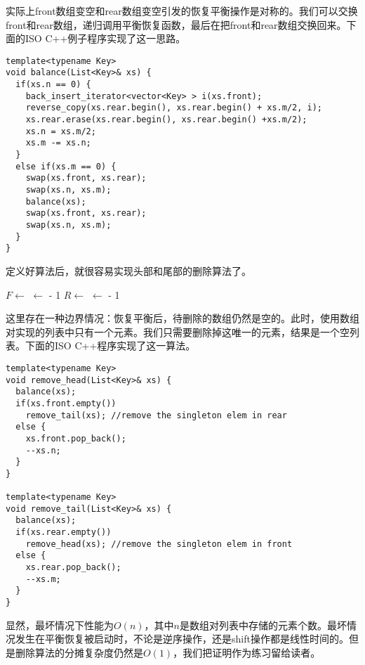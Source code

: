 \documentclass[UTF8]{article}
\begin{document}
实际上front数组变空和rear数组变空引发的恢复平衡操作是对称的。我们可以交换front和rear数组，递归调用平衡恢复函数，最后在把front和rear数组交换回来。下面的ISO C++例子程序实现了这一思路。

\begin{lstlisting}
template<typename Key>
void balance(List<Key>& xs) {
  if(xs.n == 0) {
    back_insert_iterator<vector<Key> > i(xs.front);
    reverse_copy(xs.rear.begin(), xs.rear.begin() + xs.m/2, i);
    xs.rear.erase(xs.rear.begin(), xs.rear.begin() +xs.m/2);
    xs.n = xs.m/2;
    xs.m -= xs.n;
  }
  else if(xs.m == 0) {
    swap(xs.front, xs.rear);
    swap(xs.n, xs.m);
    balance(xs);
    swap(xs.front, xs.rear);
    swap(xs.n, xs.m);
  }
}
\end{lstlisting}

定义好算法后，就很容易实现头部和尾部的删除算法了。

\begin{algorithmic}
  \State {}
  \State $F \gets $ 
    \State {}
  \Else
    \State {} $\gets $  - 1
  \EndIf
\EndFunction
\Statex
{}
  \State {}
  \State $R \gets $ 
    \State {}
  \Else
    \State {} $\gets $  - 1
  \EndIf
\EndFunction
\end{algorithmic}

这里存在一种边界情况：恢复平衡后，待删除的数组仍然是空的。此时，使用数组对实现的列表中只有一个元素。我们只需要删除掉这唯一的元素，结果是一个空列表。下面的ISO C++程序实现了这一算法。

\begin{lstlisting}
template<typename Key>
void remove_head(List<Key>& xs) {
  balance(xs);
  if(xs.front.empty())
    remove_tail(xs); //remove the singleton elem in rear
  else {
    xs.front.pop_back();
    --xs.n;
  }
}

template<typename Key>
void remove_tail(List<Key>& xs) {
  balance(xs);
  if(xs.rear.empty())
    remove_head(xs); //remove the singleton elem in front
  else {
    xs.rear.pop_back();
    --xs.m;
  }
}
\end{lstlisting}

显然，最坏情况下性能为$O(n)$，其中$n$是数组对列表中存储的元素个数。最坏情况发生在平衡恢复被启动时，不论是逆序操作，还是shift操作都是线性时间的。但是删除算法的分摊复杂度仍然是$O(1)$，我们把证明作为练习留给读者。
\end{document}
